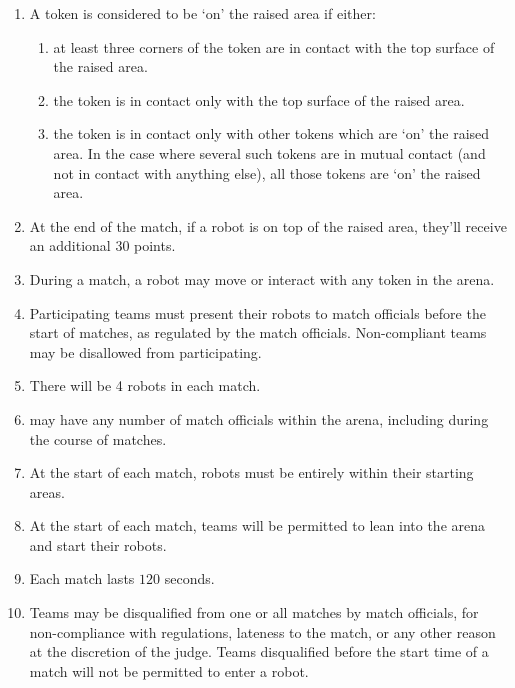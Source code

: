 \begin{enumerate}
\begin{enumerate}
    \end{enumerate}
  \item A token is considered to be `on' the raised area if either:
    \begin{enumerate}
      \item at least three corners of the token are in contact with the top
            surface of the raised area.
      \item the token is in contact only with the top surface of the raised area.
      \item the token is in contact only with other tokens which are `on' the raised area.
            In the case where several such tokens are in mutual contact (and not in
            contact with anything else), all those tokens are `on' the raised area.
    \end{enumerate}
  \item At the end of the match, if a robot is on top of the raised area, they'll
        receive an additional 30 points.
  \item During a match, a robot may move or interact with any token in the arena.
  \item Participating teams must present their robots to match officials before
        the start of matches, as regulated by the match officials. Non-compliant
        teams may be disallowed from participating.
  \item There will be 4 robots in each match.
  \item \org may have any number of match officials within the arena, including
        during the course of matches.
  \item At the start of each match, robots must be entirely within their
        starting areas.
  \item At the start of each match, teams will be permitted to lean into the
        arena and start their robots.
  \item Each match lasts $120$ seconds.
  \item Teams may be disqualified from one or all matches by match officials,
        for non-compliance with regulations, lateness to the match, or any other
        reason at the discretion of the judge. Teams disqualified before the
        start time of a match will not be permitted to enter a robot.
\end{enumerate}
